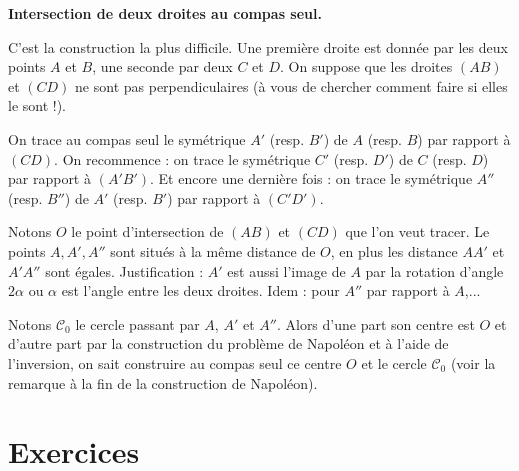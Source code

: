 \documentclass[11pt,class=report,crop=false]{standalone}
\begin{document}
\bigskip

\textbf{Intersection de deux droites au compas seul.}

C'est la construction la plus difficile.
Une première droite est donnée par les deux points $A$ et $B$, une seconde par deux $C$ et $D$.
On suppose que les droites $(AB)$ et $(CD)$ ne sont pas perpendiculaires (à vous de chercher comment faire si elles le sont !).

On trace au compas seul le symétrique $A'$ (resp. $B'$) de $A$ (resp. $B$) par rapport à $(CD)$.
On recommence : on trace le symétrique $C'$ (resp. $D'$) de $C$ (resp. $D$)  par rapport à $(A'B')$.
Et encore une dernière fois : on trace le symétrique $A''$ (resp. $B''$) de $A'$ (resp. $B'$) par rapport à $(C'D')$.

Notons $O$ le point d'intersection de $(AB)$ et $(CD)$ que l'on veut tracer.
Le points $A,A',A''$ sont situés à la même distance de $O$, en plus les distance
$AA'$ et $A'A''$ sont égales. Justification : 
$A'$ est aussi l'image de $A$ par la rotation d'angle $2\alpha$ ou $\alpha$ est l'angle entre les deux droites.
Idem : pour $A''$ par rapport à $A$,...

Notons $\mathcal{C}_0$ le cercle passant par $A$, $A'$ et $A''$.
Alors d'une part son centre est $O$ et d'autre part
par la construction du problème de Napoléon et à l'aide de l'inversion, on sait 
construire au compas seul ce centre $O$ et le cercle $\mathcal{C}_0$ 
(voir la remarque à la fin de la construction de Napoléon).



\section{Exercices}



\end{document}
